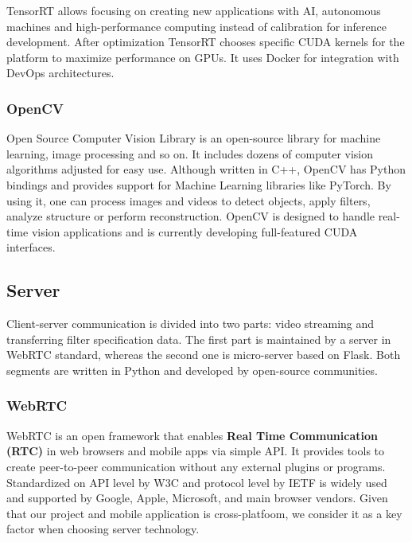 \documentclass[../Main.tex]{subfiles}
\begin{document}
    TensorRT allows focusing on creating new applications with AI, autonomous machines
    and high-performance computing instead of calibration for inference development.
    After optimization TensorRT chooses specific CUDA kernels for the platform to maximize
    performance on GPUs. It uses Docker for integration with DevOps architectures.
    

    \subsubsection{OpenCV}
    Open Source Computer Vision Library is an open-source library for machine learning,
    image processing and so on. It includes dozens of computer vision algorithms adjusted
    for easy use. Although written in C++, OpenCV has Python bindings and provides support
    for Machine Learning libraries like PyTorch.  By using it, one can process
    images and videos to detect objects, apply filters, analyze structure or
    perform reconstruction. OpenCV is designed to handle real-time vision
    applications and is currently developing full-featured CUDA interfaces.


\newpage
\subsection{Server}
    Client-server communication is divided into two parts: video streaming and transferring filter specification data. The first part is maintained by a server in WebRTC standard, whereas the second one is micro-server based on Flask. Both segments are written in Python and developed by open-source communities.

    \subsubsection{WebRTC}
    WebRTC is an open framework that enables \textbf{Real Time Communication (RTC)} in web browsers and mobile apps via simple API. It provides tools to create peer-to-peer communication without any external plugins or programs. Standardized on API level by W3C 
    and protocol level by IETF 
    is widely used and supported by Google, Apple, Microsoft, and main browser vendors. Given that our project and mobile application is cross-platfoom, we consider it as a key factor when choosing server technology.
    
\end{document}
